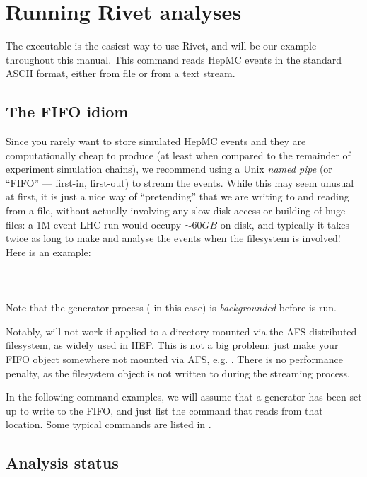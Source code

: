 \section{Running Rivet analyses}
\label{sec:agile-runmc}

The  executable is the easiest way to use Rivet, and will be our
example throughout this manual. This command reads HepMC events in the standard
ASCII format, either from file or from a text stream.

\subsection{The FIFO idiom}
\label{sec:fifo-idiom}

Since you rarely want to store simulated HepMC events and they are
computationally cheap to produce (at least when compared to the remainder of
experiment simulation chains), we recommend using a Unix \emph{named pipe} (or
``FIFO'' --- first-in, first-out) to stream the events. While this may seem
unusual at first, it is just a nice way of ``pretending'' that we are writing to
and reading from a file, without actually involving any slow disk access or
building of huge files: a 1M event LHC run would occupy $\sim 60 GB$ on disk,
and typically it takes twice as long to make and analyse the events when the
filesystem is involved! Here is an example:\\
\\
\\
\\
%
Note that the generator process ( in this case) is
\emph{backgrounded} before  is run.

Notably,  will not work if applied to a directory mounted via the
AFS distributed filesystem, as widely used in HEP. This is not a big problem:
just make your FIFO object somewhere not mounted via AFS, e.g. . There
is no performance penalty, as the filesystem object is not written to during the
streaming process.

In the following command examples, we will assume that a generator has been set
up to write to the  FIFO, and just list the  command
that reads from that location. Some typical  commands are
listed in .


\subsection{Analysis status}

